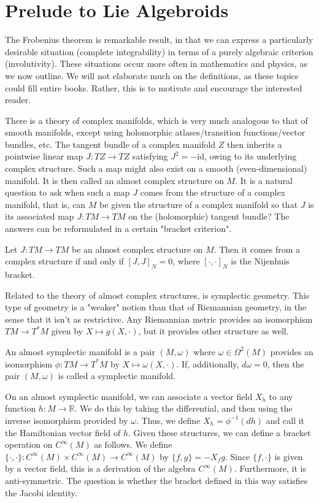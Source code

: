 \section{Prelude to Lie Algebroids}

The Frobenius theorem is remarkable result, in that we can express a particularly desirable situation (complete integrability) in terms of a purely algebraic criterion (involutivity). These situations occur more often in mathematics and physics, as we now outline. We will not elaborate much on the definitions, as these topics could fill entire books. Rather, this is to motivate and encourage the interested reader.\par
There is a theory of complex manifolds, which is very much analogous to that of smooth manifolds, except using holomorphic atlases/transition functions/vector bundles, etc. The tangent bundle of a complex manifold $Z$ then inherits a pointwise linear map $J:TZ\to TZ$ satisfying $J^2=-\text{id}$, owing to its underlying complex structure. Such a map might also exist on a smooth (even-dimensional) manifold. It is then called an almost complex structure on $M$. It is a natural question to ask when such a map $J$ comes from the structure of a complex manifold, that is, can $M$ be given the structure of a complex manifold so that $J$ is its associated map $J:TM\to TM$ on the (holomorphic) tangent bundle? The answers can be reformulated in a certain "bracket criterion".
\begin{theorem}
  Let $J:TM\to TM$ be an almost complex structure on $M$. Then it comes from a complex structure if and only if $[J,J]_N=0$, where $[\cdot,\cdot]_N$ is the Nijenhuis bracket.
\end{theorem}
Related to the theory of almost complex structures, is symplectic geometry. This type of geometry is a "weaker" notion than that of Riemannian geometry, in the sense that it isn't as restrictive. Any Riemannian metric provides an isomorphism $TM\to T^*M$ given by $X\mapsto g(X,\cdot)$, but it provides other structure as well.
\begin{definition}
  An almost symplectic manifold is a pair $(M,\omega)$ where $\omega\in\Omega^2(M)$ provides an isomorphism $\phi:TM\to T^*M$ by $X\mapsto \omega(X,\cdot)$. If, additionally, $d\omega=0$, then the pair $(M,\omega)$ is called a symplectic manifold.
\end{definition}
On an almost symplectic manifold, we can associate a vector field $X_h$ to any function $h:M\to\mathbb{R}$. We do this by taking the differential, and then using the inverse isomorphism provided by $\omega$. Thus, we define $X_h=\phi^{-1}(dh)$ and call it the Hamiltonian vector field of $h$. Given these structures, we can define a bracket operation on $C^\infty(M)$ as follows. We define $\{\cdot,\cdot\}:C^\infty(M)\times C^\infty(M)\to C^\infty(M)$ by $\{f,g\}=-X_fg$. Since $\{f,\cdot\}$ is given by a vector field, this is a derivation of the algebra $C^\infty(M)$. Furthermore, it is anti-symmetric. The question is whether the bracket defined in this way satisfies the Jacobi identity.
